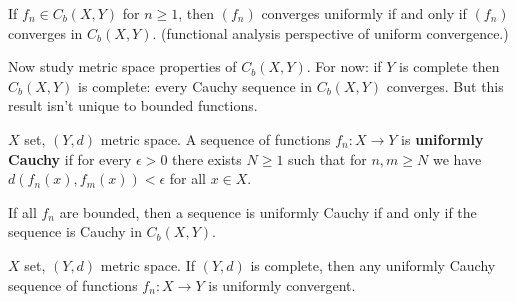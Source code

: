 \begin{corollary}

If \(f_n \in C_b(X, Y)\) for \(n \geq 1\), then \((f_n)\) converges uniformly if and only if \((f_n)\) converges in \(C_b(X, Y)\). (functional analysis perspective of uniform convergence.)

\end{corollary}

Now study metric space properties of \(C_b(X, Y)\). For now: if \(Y\) is complete then \(C_b(X,Y)\) is complete: every Cauchy sequence in \(C_b(X,Y)\) converges. But this result isn't unique to bounded functions.

\begin{definition}

\(X\) set, \((Y,d)\) metric space. A sequence of functions \(f_n: X \to Y\) is \textbf{uniformly Cauchy} if for every \(\epsilon >0\) there exists \(N \geq 1\) such that for \(n, m \geq N\) we have \(d(f_n(x), f_m(x)) < \epsilon\) for all \(x \in X\).

\end{definition}

If all \(f_n\) are bounded, then a sequence is uniformly Cauchy if and only if the sequence is Cauchy in \(C_b(X, Y)\).

\begin{theorem}\label{ra.thm.tricky}

\(X\) set, \((Y,d)\) metric space. If \((Y, d)\) is complete, then any uniformly Cauchy sequence of functions \(f_n: X \to Y\) is uniformly convergent.

\end{theorem}

